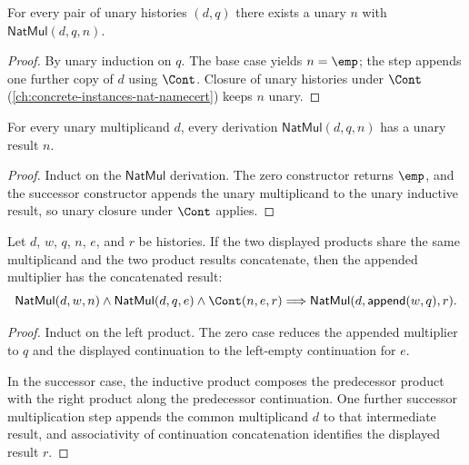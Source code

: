 \begin{lemma}
\label{lem:nat-mul-total}
For every pair of unary histories \((d, q)\) there exists a unary \(n\) with \(\mathsf{NatMul}(d, q, n)\).
\end{lemma}
\begin{proof}
By unary induction on \(q\). The base case yields \(n = \emp\); the step appends one further copy of \(d\) using \(\Cont\). Closure of unary histories under \(\Cont\) (\autoref{ch:concrete-instances-nat-namecert}) keeps \(n\) unary.
\end{proof}

\begin{lemma}
\label{lem:nat-mul-result-unary}
For every unary multiplicand $d$, every derivation
$\mathsf{NatMul}(d,q,n)$ has a unary result $n$.
\end{lemma}
\begin{proof}
Induct on the $\mathsf{NatMul}$ derivation. The zero constructor returns
$\emp$, and the successor constructor appends the unary multiplicand to the
unary inductive result, so unary closure under $\Cont$ applies.
\end{proof}

\begin{theorem}
\label{thm:natmul-append-continuation-closure}
Let $d$, $w$, $q$, $n$, $e$, and $r$ be histories. If the two displayed
products share the same multiplicand and the two product results concatenate,
then the appended multiplier has the concatenated result:
$$
\mathsf{NatMul}(d,w,n)\land
\mathsf{NatMul}(d,q,e)\land
\Cont(n,e,r)
\Longrightarrow
\mathsf{NatMul}(d,\mathsf{append}(w,q),r).
$$
\end{theorem}
\begin{proof}
Induct on the left product. The zero case reduces the appended multiplier to
$q$ and the displayed continuation to the left-empty continuation for $e$.

In the successor case, the inductive product composes the predecessor product
with the right product along the predecessor continuation. One further
successor multiplication step appends the common multiplicand $d$ to that
intermediate result, and associativity of continuation concatenation identifies
the displayed result $r$.
\end{proof}

